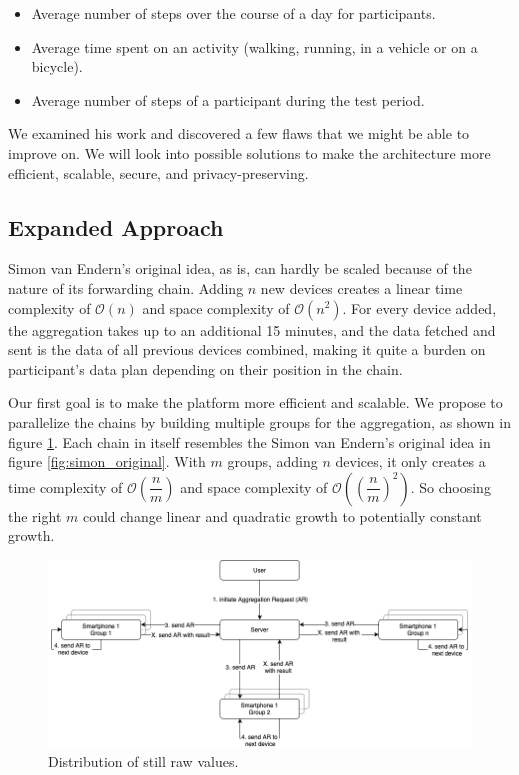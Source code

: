 \begin{itemize}
    \item Average number of steps over the course of a day for participants. 
    \item Average time spent on an activity (walking, running, in a vehicle or on a bicycle).
    \item Average number of steps of a participant during the test period. 
\end{itemize}

We examined his work and discovered a few flaws that we might be able to improve on. We will look into possible solutions to make the architecture more efficient, scalable, secure, and privacy-preserving. 

\subsection{Expanded Approach}
Simon van Endern's original idea, as is, can hardly be scaled because of the nature of its forwarding chain. Adding \(n\) new devices creates a linear time complexity of \(\mathcal{O}(n)\) and space complexity of \(\mathcal{O}(n^2)\). For every device added, the aggregation takes up to an additional 15 minutes, and the data fetched and sent is the data of all previous devices combined, making it quite a burden on participant's data plan depending on their position in the chain.

Our first goal is to make the platform more efficient and scalable. We propose to parallelize the chains by building multiple groups for the aggregation, as shown in figure \ref{fig:aggregation}. Each chain in itself resembles the Simon van Endern's original idea in figure \ref{fig:simon_original}. With \(m\) groups, adding \(n\) devices, it only creates a time complexity of \(\mathcal{O}(\dfrac{n}{m})\) and space complexity of \(\mathcal{O}((\dfrac{n}{m})^2)\). So choosing the right \(m\) could change linear and quadratic growth to potentially constant growth. 

\begin{figure}[htpb]
  \centering
  \includegraphics[width=\textwidth]{figures/aggregation}
  \caption{Distribution of still raw values.} \label{fig:aggregation}
\end{figure}

